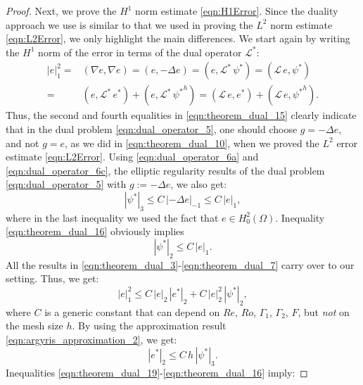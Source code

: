 \begin{proof}
  Next, we prove the $H^1$ norm estimate \eqref{eqn:H1Error}.  Since the duality
  approach we use is similar to that we used in proving the  $L^2$ norm estimate
  \eqref{eqn:L2Error}, we only highlight the main differences.  We start again
  by writing the $H^1$ norm of the error in terms of the dual operator
  $\mathcal{L}^*$:
  \begin{align}
    |e|_1^2 =& (\nabla e , \nabla e) = ( e , - \Delta e) =
      (e , \mathcal{L}^* \, \psi^*) = (\mathcal{L} \, e , \psi^*) \nonumber \\
    =& (e , \mathcal{L}^* \, e^*) + (e , \mathcal{L}^* \, {\psi^*}^h)
      = (\mathcal{L} \, e , e^*) + (\mathcal{L} \, e , {\psi^*}^h) .
    \label{eqn:theorem_dual_15}
  \end{align}
  Thus, the second and fourth equalities in \eqref{eqn:theorem_dual_15} clearly
  indicate that in the dual problem \eqref{eqn:dual_operator_5}, one should
  choose $g = - \Delta e$, and not $g = e$, as we did in
  \eqref{eqn:theorem_dual_10}, when we proved the $L^2$ error estimate
  \eqref{eqn:L2Error}.  Using \eqref{eqn:dual_operator_6a} and
  \eqref{eqn:dual_operator_6c}, the elliptic regularity results of the dual
  problem \eqref{eqn:dual_operator_5} with $g :=  - \Delta e$, we also get:
  \begin{equation}
    | \psi^* |_3 \leq C \, | - \Delta e |_{-1} \leq C \, | e |_1 ,
    \label{eqn:theorem_dual_16}
  \end{equation}
  where in the last inequality we used the fact that $e \in H_0^2(\Omega)$.
  Inequality \eqref{eqn:theorem_dual_16} obviously implies
  \begin{equation}
    | \psi^* |_2 \leq C \, | e |_1 .
    \label{eqn:theorem_dual_17}
  \end{equation}
  All the results in \eqref{eqn:theorem_dual_3}-\eqref{eqn:theorem_dual_7} carry
  over to our setting.  Thus, we get:
  \begin{equation}
    |e|_1^2 \leq C \, | e |_2 \, |e^* |_2 + C \, | e |_2^2 \, | \psi^* |_2 ,
    \label{eqn:theorem_dual_18}
  \end{equation}
  where $C$ is a generic constant that can depend on $Re$, $Ro$, $\Gamma_1$,
  $\Gamma_2$,  $F$, but \emph{not} on the mesh size $h$.  By using the
  approximation result \eqref{eqn:argyris_approximation_2}, we get:
  \begin{equation}
    |e^* |_2 \leq C \, h \, | \psi^* |_3 .
    \label{eqn:theorem_dual_19}
  \end{equation}
  Inequalities \eqref{eqn:theorem_dual_19}-\eqref{eqn:theorem_dual_16} imply:

\end{proof}
